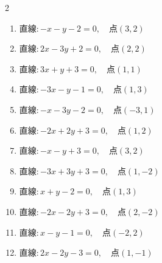 \begin{multicols}{2}
\begin{enumerate}
  \item $直線:-x-y-2=0,\quad 点 ( 3, 2 )$


  \item $直線:2x-3y+2=0,\quad 点 ( 2, 2 )$

        \phantom{$\displaystyle 距離 : 0$}

  \item $直線:3x+y+3=0,\quad 点 ( 1, 1 )$


  \item $直線:-3x-y-1=0,\quad 点 ( 1, 3 )$


  \item $直線:-x-3y-2=0,\quad 点 ( -3, 1 )$


  \item $直線:-2x+2y+3=0,\quad 点 ( 1, 2 )$


\columnbreak %

  \item $直線:-x-y+3=0,\quad 点 ( 3, 2 )$


  \item $直線:-3x+3y+3=0,\quad 点 ( 1, -2 )$


  \item $直線:x+y-2=0,\quad 点 ( 1, 3 )$


  \item $直線:-2x-2y+3=0,\quad 点 ( 2, -2 )$


  \item $直線:x-y-1=0,\quad 点 ( -2, 2 )$


  \item $直線:2x-2y-3=0,\quad 点 ( 1, -1 )$


\end{enumerate}
\end{multicols}
